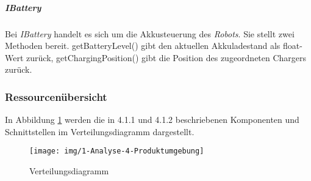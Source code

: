     	\subparagraph{IBattery}\label{ibattery}
    		Bei \emph{IBattery} handelt es sich um die Akkusteuerung des \emph{Robots}. Sie stellt zwei Methoden bereit. getBatteryLevel() gibt den aktuellen Akkuladestand als float-Wert zurück, getChargingPosition() gibt die Position des zugeordneten Chargers zurück.


\pagebreak
\subsubsection{Ressourcenübersicht}
    In Abbildung \ref{fig:4-1-3-verteilungsdiagramm} werden die in 4.1.1 und 4.1.2 beschriebenen
    Komponenten und Schnittstellen im Verteilungsdiagramm dargestellt.

    \begin{figure}[H]
      \centering
      \texttt{[image: img/1-Analyse-4-Produktumgebung]}
      \caption{Verteilungsdiagramm}
      \label{fig:4-1-3-verteilungsdiagramm}
    \end{figure}
